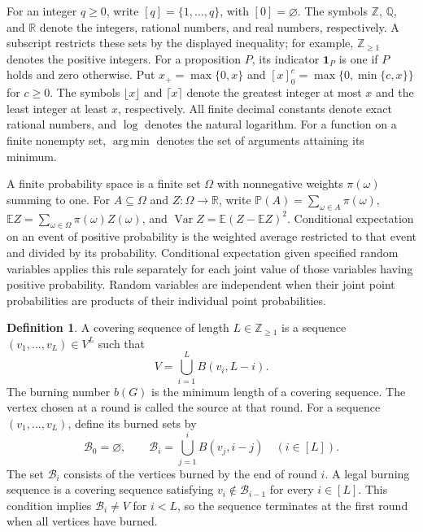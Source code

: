 \documentclass[11pt]{article}
\numberwithin{equation}{section}
\theoremstyle{definition}
\newtheorem{definition}[theorem]{Definition}
\newcommand{\Z}{\mathbb Z}
\newcommand{\Q}{\mathbb Q}
\newcommand{\R}{\mathbb R}
\newcommand{\E}{\mathbb E}
\newcommand{\Prob}{\mathbb P}
\newcommand{\Var}{\operatorname{Var}}
\newcommand{\ind}{\mathbf 1}
\DeclareMathOperator*{\argmin}{arg\,min}
\begin{document}
For an integer $q\ge0$, write $[q]=\{1,\ldots,q\}$, with $[0]=\varnothing$.
The symbols $\Z$, $\Q$, and $\R$ denote the integers, rational numbers,
and real numbers, respectively. A subscript restricts these sets by the
displayed inequality; for example, $\Z_{\ge1}$ denotes the positive
integers.
For a proposition $P$, its indicator $\ind_P$ is one if $P$ holds and zero
otherwise. Put $x_+=\max\{0,x\}$ and
$[x]_0^c=\max\{0,\min\{c,x\}\}$ for $c\ge0$.
The symbols $\lfloor x\rfloor$ and $\lceil x\rceil$ denote the greatest
integer at most $x$ and the least integer at least $x$, respectively.
All finite decimal constants denote exact rational numbers, and $\log$
denotes the natural logarithm. For a function on a finite nonempty set,
$\argmin$ denotes the set of arguments attaining its minimum.

A finite probability space is a finite set $\Omega$ with nonnegative
weights $\pi(\omega)$ summing to one. For $A\subseteq\Omega$ and
$Z:\Omega\to\R$, write
$\Prob(A)=\sum_{\omega\in A}\pi(\omega)$,
$\E Z=\sum_{\omega\in\Omega}\pi(\omega)Z(\omega)$, and
$\Var Z=\E(Z-\E Z)^2$.
Conditional expectation on an event of positive probability is the
weighted average restricted to that event and divided by its probability.
Conditional expectation given specified random variables applies this
rule separately for each joint value of those variables having positive
probability.
Random variables are independent when their joint point probabilities
are products of their individual point probabilities.

\begin{definition}\label{def:burning}
A covering sequence of length $L\in\Z_{\ge1}$ is a sequence
$(v_1,\ldots,v_L)\in V^L$ such that
\begin{equation}\label{eq:cover-sequence}
 V=\bigcup_{i=1}^{L}B(v_i,L-i).
\end{equation}
The burning number $b(G)$ is the minimum length of a covering sequence.
The vertex chosen at a round is called the source at that round.
For a sequence $(v_1,\ldots,v_L)$, define its burned sets by
\[
 \mathcal B_0=\varnothing,\qquad
 \mathcal B_i=\bigcup_{j=1}^i B(v_j,i-j)\quad(i\in[L]).
\]
The set $\mathcal B_i$ consists of the vertices burned by the end of
round $i$. A legal burning sequence is a covering sequence satisfying
$v_i\notin\mathcal B_{i-1}$ for every $i\in[L]$.
This condition implies $\mathcal B_i\ne V$ for $i<L$, so the sequence
terminates at the first round when all vertices have burned.
\end{definition}
\end{document}
